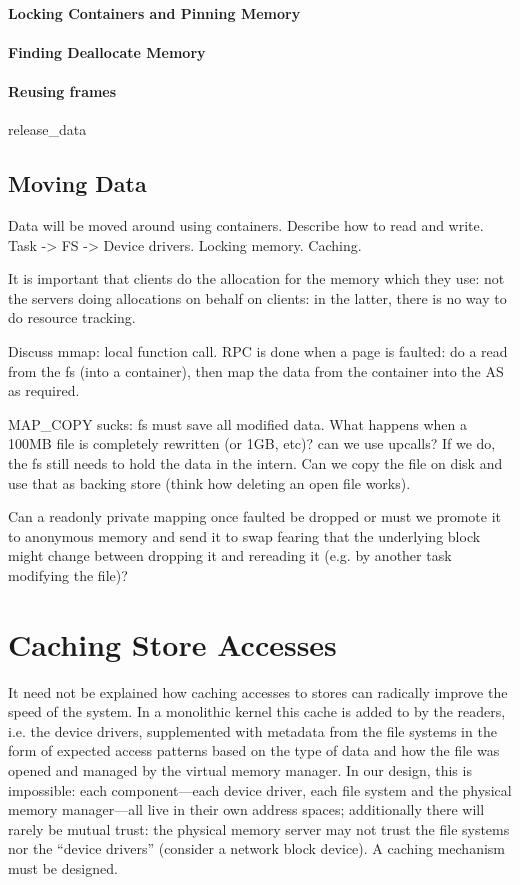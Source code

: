 \paragraph{Locking Containers and Pinning Memory}

\paragraph{Finding Deallocate Memory}

\paragraph{Reusing frames}

release\_data

\subsection{Moving Data}

Data will be moved around using containers.  Describe how to read and
write.  Task -> FS -> Device drivers.  Locking memory.  Caching.

It is important that clients do the allocation for the memory which
they use: not the servers doing allocations on behalf on clients: in
the latter, there is no way to do resource tracking.

Discuss mmap: local function call.  RPC is done when a page is
faulted: do a read from the fs (into a container), then map the data
from the container into the AS as required.

MAP\_COPY sucks: fs must save all modified data.  What happens when a
100MB file is completely rewritten (or 1GB, etc)?  can we use upcalls?
If we do, the fs still needs to hold the data in the intern.  Can we
copy the file on disk and use that as backing store (think how
deleting an open file works).

Can a readonly private mapping once faulted be dropped or must we
promote it to anonymous memory and send it to swap fearing that the
underlying block might change between dropping it and rereading it
(e.g. by another task modifying the file)?

\section{Caching Store Accesses}

It need not be explained how caching accesses to stores can radically
improve the speed of the system.  In a monolithic kernel this cache is
added to by the readers, i.e. the device drivers, supplemented with
metadata from the file systems in the form of expected access patterns
based on the type of data and how the file was opened and managed by
the virtual memory manager.  In our design, this is impossible: each
component---each device driver, each file system and the physical
memory manager---all live in their own address spaces; additionally
there will rarely be mutual trust: the physical memory server may not
trust the file systems nor the ``device drivers'' (consider a network
block device).  A caching mechanism must be designed.

